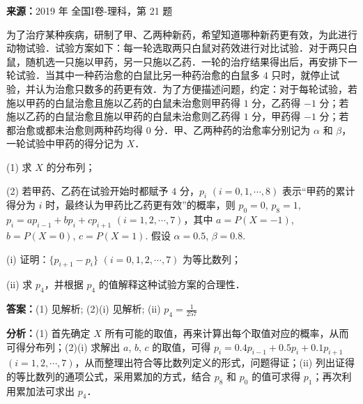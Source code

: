 \begin{question}[points=12]
\textbf{来源：}2019 年 全国I卷-理科，第 21 题\par
为了治疗某种疾病，研制了甲、乙两种新药，希望知道哪种新药更有效，为此进行动物试验．试验方案如下：每一轮选取两只白鼠对药效进行对比试验．对于两只白鼠，随机选一只施以甲药，另一只施以乙药．一轮的治疗结果得出后，再安排下一轮试验．当其中一种药治愈的白鼠比另一种药治愈的白鼠多 $4$ 只时，就停止试验，并认为治愈只数多的药更有效．为了方便描述问题，约定：对于每轮试验，若施以甲药的白鼠治愈且施以乙药的白鼠未治愈则甲药得 $1$ 分，乙药得 $-1$ 分；若施以乙药的白鼠治愈且施以甲药的白鼠未治愈则乙药得 $1$ 分，甲药得 $-1$ 分；若都治愈或都未治愈则两种药均得 $0$ 分．甲、乙两种药的治愈率分别记为 $\alpha$ 和 $\beta$，一轮试验中甲药的得分记为 $X$．

(1) 求 $X$ 的分布列；

(2) 若甲药、乙药在试验开始时都赋予 $4$ 分，$p_i$ $(i = 0, 1, \cdots, 8)$ 表示“甲药的累计得分为 $i$ 时，最终认为甲药比乙药更有效”的概率，则 $p_0 = 0$, $p_8 = 1$, $p_i = a p_{i-1} + b p_i + c p_{i+1}$ $(i = 1, 2, \cdots, 7)$，其中 $a = P(X = -1)$, $b = P(X = 0)$, $c = P(X = 1)$. 假设 $\alpha = 0.5$, $\beta = 0.8$.

(i) 证明：$\{p_{i+1} - p_i\}$ $(i = 0, 1, 2, \cdots, 7)$ 为等比数列；

(ii) 求 $p_4$，并根据 $p_4$ 的值解释这种试验方案的合理性．
\begin{solution}
\textbf{答案：}(1) 见解析; (2)(i) 见解析; (ii) $p_4 = \frac{1}{257}$

\textbf{分析：}(1) 首先确定 $X$ 所有可能的取值，再来计算出每个取值对应的概率，从而可得分布列；(2)(i) 求解出 $a$, $b$, $c$ 的取值，可得 $p_i = 0.4p_{i-1} + 0.5p_i + 0.1p_{i+1}$ $(i = 1,2,\cdots,7)$，从而整理出符合等比数列定义的形式，问题得证；(ii) 列出证得的等比数列的通项公式，采用累加的方式，结合 $p_8$ 和 $p_0$ 的值可求得 $p_1$；再次利用累加法可求出 $p_4$．


\end{solution}
\end{question}
